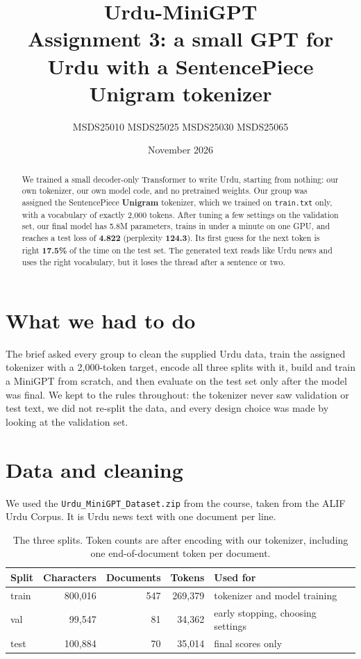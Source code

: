 \documentclass[11pt,a4paper]{article}
\title{\textbf{Urdu-MiniGPT}\\[0.3em]\large Assignment 3: a small GPT for Urdu with a SentencePiece Unigram tokenizer}
\author{MSDS25010 \quad\textbar\quad MSDS25025 \quad\textbar\quad MSDS25030 \quad\textbar\quad MSDS25065}
\date{November 2026}
\begin{document}
\maketitle

\begin{abstract}
We trained a small decoder-only Transformer to write Urdu, starting from nothing: our own tokenizer, our own model code, and no pretrained weights. Our group was assigned the SentencePiece \textbf{Unigram} tokenizer, which we trained on \texttt{train.txt} only, with a vocabulary of exactly 2{,}000 tokens. After tuning a few settings on the validation set, our final model has 5.8M parameters, trains in under a minute on one GPU, and reaches a test loss of \textbf{4.822} (perplexity \textbf{124.3}). Its first guess for the next token is right \textbf{17.5\%} of the time on the test set. The generated text reads like Urdu news and uses the right vocabulary, but it loses the thread after a sentence or two.
\end{abstract}

\section{What we had to do}

The brief asked every group to clean the supplied Urdu data, train the assigned tokenizer with a 2{,}000-token target, encode all three splits with it, build and train a MiniGPT from scratch, and then evaluate on the test set only after the model was final. We kept to the rules throughout: the tokenizer never saw validation or test text, we did not re-split the data, and every design choice was made by looking at the validation set.

\section{Data and cleaning}

We used the \texttt{Urdu\_MiniGPT\_Dataset.zip} from the course, taken from the ALIF Urdu Corpus. It is Urdu news text with one document per line.

\begin{table}[H]
\centering
\begin{tabular}{lrrrl}
\toprule
Split & Characters & Documents & Tokens & Used for \\
\midrule
train & 800{,}016 & 547 & 269{,}379 & tokenizer and model training \\
val   &  99{,}547 &  81 &  34{,}362 & early stopping, choosing settings \\
test  & 100{,}884 &  70 &  35{,}014 & final scores only \\
\bottomrule
\end{tabular}
\caption{The three splits. Token counts are after encoding with our tokenizer, including one end-of-document token per document.}
\end{table}
\end{document}

